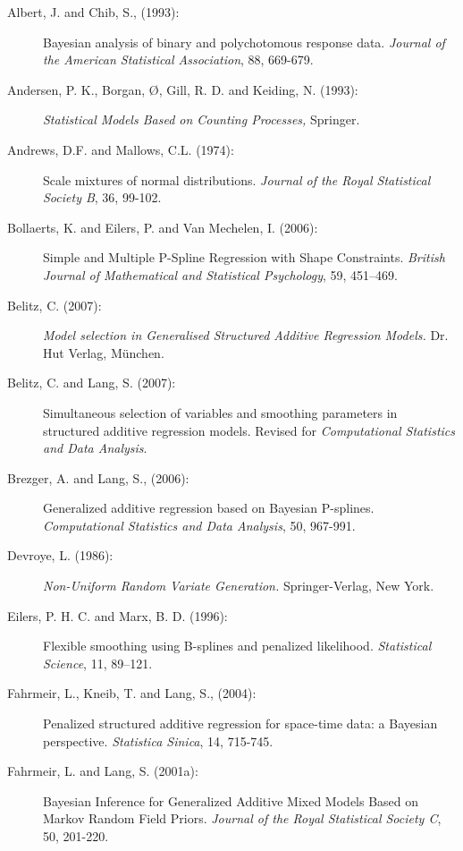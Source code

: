 \documentclass[11pt,a4paper,twoside]{bayesxarticle}
\begin{document}
\begin{description}
\item[Albert, J. and Chib, S., (1993):]
Bayesian analysis of binary and polychotomous response data. {\it
Journal of the American Statistical Association},  88, 669-679.

\item[Andersen, P. K., Borgan, {\O}, Gill, R. D. and Keiding, N. (1993):]
{\it Statistical Models Based on Counting Processes,} Springer.

\item[Andrews, D.F. and Mallows, C.L. (1974):]
Scale mixtures of normal distributions. {\it Journal of the Royal
Statistical Society B}, 36, 99-102.

\item[Bollaerts, K. and Eilers, P. and Van Mechelen, I. (2006):]
Simple and Multiple P-Spline Regression with Shape Constraints.
{\it British Journal of Mathematical and Statistical Psychology},
59, 451--469.

\item[Belitz, C. (2007):] {\it Model selection in Generalised Structured Additive Regression Models.} Dr. Hut Verlag, M\"{u}nchen.

\item[Belitz, C.  and Lang, S. (2007):] Simultaneous selection of variables and smoothing parameters
in structured additive regression models. Revised for {\em Computational Statistics and Data Analysis}.


\item[Brezger, A. and Lang, S., (2006):]
Generalized additive regression based on Bayesian P-splines. {\it
Computational Statistics and Data Analysis}, 50, 967-991.

\item[Devroye, L. (1986):]
{\it Non-Uniform Random Variate Generation.} Springer-Verlag, New
York.

\item[Eilers, P. H. C. and Marx, B. D. (1996):]
Flexible smoothing using B-splines and penalized likelihood.
{\it Statistical Science}, 11, 89--121.

\item[Fahrmeir, L., Kneib, T. and Lang, S., (2004):] Penalized
structured additive regression for space-time data: a Bayesian
perspective. {\em Statistica Sinica}, 14, 715-745.

\item[Fahrmeir, L. and Lang, S. (2001a):] Bayesian Inference for
Generalized Additive Mixed Models Based on Markov Random Field
Priors. {\em Journal of the Royal Statistical Society C}, 50,
201-220.


\end{description}
\end{document}
